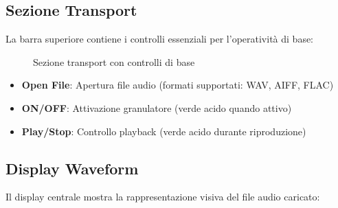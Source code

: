 \documentclass[a4paper,11pt,openany]{book}
\begin{document}
\subsection{Sezione Transport}

La barra superiore contiene i controlli essenziali per l'operatività di base:

\begin{figure}[H]
    \centering
    \caption{Sezione transport con controlli di base}
    \label{fig:transport}
\end{figure}

\begin{itemize}
    \item \textbf{Open File}: Apertura file audio (formati supportati: WAV, AIFF, FLAC)
    \item \textbf{ON/OFF}: Attivazione granulatore (verde acido quando attivo)
    \item \textbf{Play/Stop}: Controllo playback (verde acido durante riproduzione)
\end{itemize}

\subsection{Display Waveform}

Il display centrale mostra la rappresentazione visiva del file audio caricato:
\end{document}
